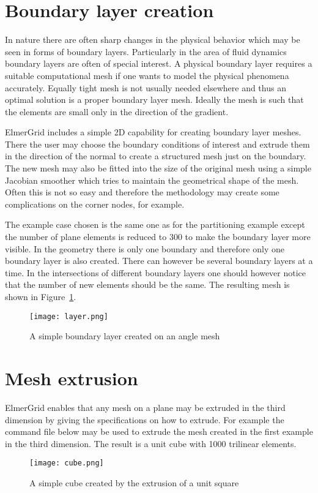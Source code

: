 \section{Boundary layer creation}

In nature there are often sharp changes in the physical 
behavior which may be seen in forms of boundary layers.
Particularly in the area of fluid dynamics boundary layers
are often of special interest. 
A physical boundary layer requires
a suitable computational mesh if one 
wants to model the physical phenomena accurately. 
Equally tight mesh is not usually needed elsewhere and thus
an optimal solution is a proper boundary layer mesh.
Ideally the mesh is such that the elements are small only in the 
direction of the gradient. 

ElmerGrid includes a simple 2D capability for creating boundary layer
meshes. There the user may choose the boundary conditions of interest 
and extrude them in the direction of the normal to create a structured 
mesh just on the boundary. The new mesh may also be fitted into the 
size of the original mesh using a simple Jacobian smoother which
tries to maintain the geometrical shape of the mesh. 
Often this is not so easy and therefore the methodology may create
some complications on the corner nodes, for example.

The example case chosen is the same one as for the 
partitioning example except the number of plane elements is reduced to
300 to make the boundary layer more visible.
In the geometry there is only one boundary and therefore 
only one boundary layer is also created. There can however be several
boundary layers at a time. In the intersections of different boundary
layers one should however notice that the number of new elements should be
the same. The resulting mesh is shown in Figure~\ref{fg:pic51}.
%


\begin{figure}[H]
\centering
\texttt{[image: layer.png]}
\caption{A simple boundary layer created on an angle mesh}
\label{fg:pic51}
\end{figure}

\section{Mesh extrusion}

ElmerGrid enables that any mesh on a plane may be extruded in the 
third dimension by giving the specifications on how to extrude.
For example the command file below may be used to extrude the mesh 
created in the first example in the third dimension. The result is a unit 
cube with 1000 trilinear elements.
%

%
\begin{figure}[H]
\centering
\texttt{[image: cube.png]}
\caption{A simple cube created by the extrusion of a unit square}
\label{fg:pic52}
\end{figure}

